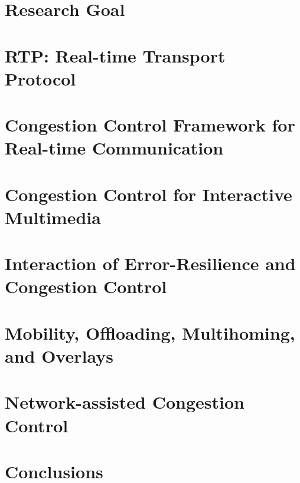 \documentclass[dissertation,draft*]{aaltoseries} %
\begin{document}
\chapter{Research Goal}
\label{chap:rg}


\chapter{RTP: Real-time Transport Protocol}
\label{chap:rtp}


\chapter{Congestion Control Framework for Real-time Communication}
\label{chap:cc.fw}


\chapter{Congestion Control for Interactive Multimedia}
\label{chap:cc}


 \chapter{Interaction of Error-Resilience and Congestion Control}
 \label{chap:er-cc}


\chapter{Mobility, Offloading, Multihoming, and Overlays}
\label{chap:mprtp}


 \chapter{Network-assisted Congestion Control}
 \label{chap:cc.nw}
 

\chapter{Conclusions}
\label{chap:conc}


\end{document}
